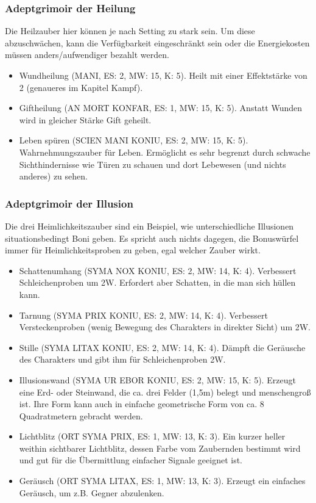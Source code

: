 \documentclass{article}
\begin{document}
\subsubsection{Adeptgrimoir der Heilung}

Die Heilzauber hier können je nach Setting zu stark sein. Um diese abzuschwächen, kann die Verfügbarkeit eingeschränkt
sein oder die Energiekosten müssen anders/aufwendiger bezahlt werden.

\begin{itemize}
\item Wundheilung (MANI, ES: 2, MW: 15, K: 5). Heilt mit einer Effektstärke von 2 (genaueres im Kapitel Kampf).
\item Giftheilung (AN MORT KONFAR, ES: 1, MW: 15, K: 5). Anstatt Wunden wird in gleicher Stärke Gift geheilt.
\item Leben spüren (SCIEN MANI KONIU, ES: 2, MW: 15, K: 5). Wahrnehmungszauber für Leben. Ermöglicht es sehr begrenzt durch schwache Sichthindernisse wie Türen zu schauen und dort Lebewesen (und nichts anderes) zu sehen.
\end{itemize}

\subsubsection{Adeptgrimoir der Illusion}

Die drei Heimlichkeitszauber sind ein Beispiel, wie unterschiedliche Illusionen situationsbedingt Boni geben. Es
spricht auch nichts dagegen, die Bonuswürfel immer für Heimlichkeitsproben zu geben, egal welcher Zauber wirkt.

\begin{itemize}
\item Schattenumhang (SYMA NOX KONIU, ES: 2, MW: 14, K: 4). Verbessert Schleichenproben um 2W. Erfordert aber Schatten, in die man sich hüllen kann.
\item Tarnung (SYMA PRIX KONIU, ES: 2, MW: 14, K: 4). Verbessert Versteckenproben (wenig Bewegung des Charakters in direkter Sicht) um 2W.
\item Stille (SYMA LITAX KONIU, ES: 2, MW: 14, K: 4). Dämpft die Geräusche des Charakters und gibt ihm für Schleichenproben 2W.
\item Illusionswand (SYMA UR EBOR KONIU, ES: 2, MW: 15, K: 5). Erzeugt eine Erd- oder Steinwand, die ca. drei Felder (1,5m) belegt und menschengroß ist. Ihre Form kann auch in einfache geometrische Form von ca. 8 Quadratmetern gebracht werden.
\item Lichtblitz (ORT SYMA PRIX, ES: 1, MW: 13, K: 3). Ein kurzer heller weithin sichtbarer Lichtblitz, dessen Farbe vom Zaubernden bestimmt wird und gut für die Übermittlung einfacher Signale geeignet ist.
\item Geräusch (ORT SYMA LITAX, ES: 1, MW: 13, K: 3). Erzeugt ein einfaches Geräusch, um z.B. Gegner abzulenken.
\end{itemize}
\end{document}
